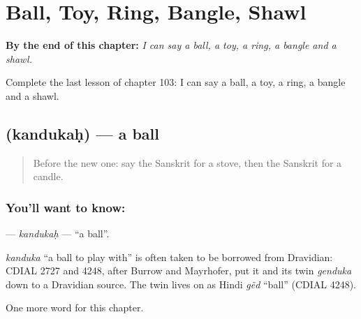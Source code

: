 
\chapter{Ball, Toy, Ring, Bangle, Shawl}
\label{ch:sa-ball-toy-ring-bangle-shawl}

\begin{chapteropening}
\textbf{By the end of this chapter:} \emph{I can say a ball, a toy, a ring, a bangle and a shawl.}

Complete the last lesson of chapter 103: I can say a ball, a toy, a ring, a bangle and a shawl.
\end{chapteropening}

\section[\texorpdfstring{\sk{कन्दुकः} (kandukaḥ)}{कन्दुकः (kandukaḥ)}]{ (kandukaḥ) — a ball}

\label{lesson:SA-C103-kandukah}



\begin{quote}
Before the new one: say the Sanskrit for a stove, then the Sanskrit for a candle.
\end{quote}

\subsection*{You'll want to know: }
\textbf{} — \emph{kandukaḥ} — \textquotedblleft{}a ball\textquotedblright{}.

\begin{cousinweb}
\emph{kanduka} \textquotedblleft{}a ball to play with\textquotedblright{} is often taken to be borrowed from Dravidian: CDIAL 2727 and 4248, after Burrow and Mayrhofer, put it and its twin \emph{genduka} down to a Dravidian source. The twin lives on as Hindi \emph{gẽd} \textquotedblleft{}ball\textquotedblright{} (CDIAL 4248).
\end{cousinweb}

\begin{grammarlens}[title={What you've built}]
One more word for this chapter.
\end{grammarlens}


